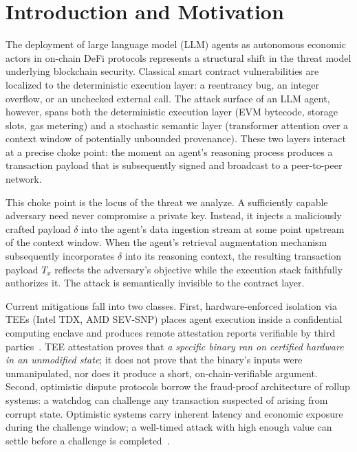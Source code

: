 \documentclass[final,5p,times,twocolumn]{elsarticle}
\theoremstyle{plain}
\theoremstyle{definition}
\theoremstyle{remark}
\begin{document}
\section{Introduction and Motivation}
\label{sec:intro}

The deployment of large language model (LLM) agents as autonomous economic
actors in on-chain DeFi protocols represents a structural shift in the threat
model underlying blockchain security. Classical smart contract vulnerabilities
are localized to the deterministic execution layer: a reentrancy bug, an
integer overflow, or an unchecked external call. The attack surface of an LLM
agent, however, spans both the deterministic execution layer (EVM bytecode,
storage slots, gas metering) and a stochastic semantic layer (transformer
attention over a context window of potentially unbounded provenance). These
two layers interact at a precise choke point: the moment an agent's reasoning
process produces a transaction payload that is subsequently signed and broadcast
to a peer-to-peer network.

This choke point is the locus of the threat we analyze. A sufficiently capable
adversary need never compromise a private key. Instead, it injects a
maliciously crafted payload $\delta$ into the agent's data ingestion stream
at some point upstream of the context window. When the agent's retrieval
augmentation mechanism subsequently incorporates $\delta$ into its reasoning
context, the resulting transaction payload $T_x$ reflects the adversary's
objective while the execution stack faithfully authorizes it. The attack is
semantically invisible to the contract layer.

Current mitigations fall into two classes. First, hardware-enforced isolation
via TEEs (Intel TDX, AMD SEV-SNP) places agent execution inside a confidential
computing enclave and produces remote attestation reports verifiable by
third parties~\cite{karim2025aibc}. TEE attestation proves that \emph{a specific
binary ran on certified hardware in an unmodified state}; it does not prove
that the binary's inputs were unmanipulated, nor does it produce a short,
on-chain-verifiable argument. Second, optimistic dispute protocols borrow
the fraud-proof architecture of rollup systems: a watchdog can challenge any
transaction suspected of arising from corrupt state. Optimistic systems carry
inherent latency and economic exposure during the challenge window; a
well-timed attack with high enough value can settle before a challenge is
completed~\cite{zhou2023sokdefi}.
\end{document}
